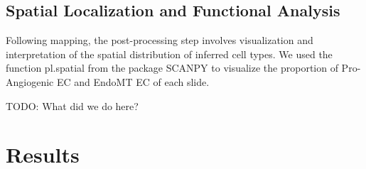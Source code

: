 \documentclass[a4paper,12pt]{article}
\begin{document}
\subsection{Spatial Localization and Functional Analysis}

Following mapping, the post-processing step involves visualization and interpretation of the spatial distribution of inferred cell types. We used the function pl.spatial from the package SCANPY \citep{scanpy} to visualize the proportion of Pro-Angiogenic EC and EndoMT EC of each slide. 

TODO: What did we do here?

\begin{comment}
We analyzed the localization of pro-angiogenic ECs, their co-localization with other vascular and immune cells, and performed pathway enrichment analyses to identify angiogenesis-related genes.

\begin{itemize}
  \item Identification of pro-angiogenic ECs in plaque regions.
  \item Co-localization with other vascular and immune cell types.
  \item Comparison across different plaque stages.
  \item Gene expression signatures of pro-angiogenic ECs.
  \item Enrichment analysis of angiogenic and inflammatory pathways.
  \item Cell-cell interaction analysis using ligand-receptor pairing (e.g., VEGF signaling).
\end{itemize}

\end{comment}

\section{Results}

\end{document}
